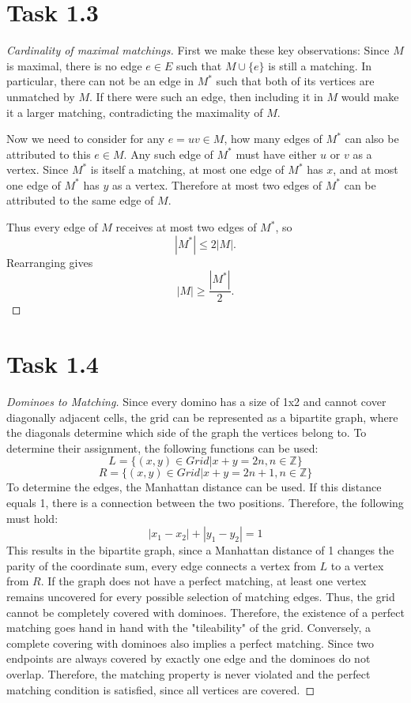 \documentclass{Group_Templ}
\begin{document}
	
	\section*{Task 1.3}
	
	\begin{proof}[Cardinality of maximal matchings]
		First we make these key observations:
    Since \(M\) is maximal, there is no edge \(e\in E\) such that \(M\cup\{e\}\) is still a matching.
    In particular, there can not be an edge in \(M^*\) such that both of its vertices are unmatched by \(M\).
    If there were such an edge, then including it in \(M\) would make it a larger matching, contradicting the maximality of \(M\).

    Now we need to consider for any \(e=uv\in M\), how many edges of \(M^*\) can also be attributed to this \(e\in M\). 
    Any such edge of \(M^*\) must have either \(u\) or \(v\) as a vertex.
    Since \(M^*\) is itself a matching, at most one edge of \(M^*\) has \(x\), and at most one edge of \(M^*\) has \(y\) as a vertex.
    Therefore at most two edges of \(M^*\) can be attributed to the same edge of \(M\).

    \vspace{1em}
    \center Thus every edge of \(M\) receives at most two edges of \(M^*\), so
    \[
    |M^*| \le 2|M|.
    \]
    Rearranging gives
    \[
    |M| \ge \frac{|M^*|}{2}.
    \]
	\end{proof}
	
	\section*{Task 1.4}
	\begin{proof}[Dominoes to Matching]
		Since every domino has a size of 1x2 and cannot cover diagonally adjacent cells, the grid can be represented as a bipartite graph, where the diagonals determine which side of the graph the vertices belong to. To determine their assignment, the following functions can be used:
		\[L=\{(x,y) \in Grid | x + y = 2n, n \in \mathbb{Z}\}\]
		\[R=\{(x,y) \in Grid | x + y = 2n+1, n \in \mathbb{Z}\}\] To determine the edges, the Manhattan distance can be used. If this distance equals 1, there is a connection between the two positions. Therefore, the following must hold:
		\[|x_1-x_2|+|y_1-y_2|=1\] This results in the bipartite graph, since a Manhattan distance of 1 changes the parity of the coordinate sum, every edge connects a vertex from \(L\) to a vertex from \(R\). If the graph does not have a perfect matching, at least one vertex remains uncovered for every possible selection of matching edges. Thus, the grid cannot be completely covered with dominoes. Therefore, the existence of a perfect matching goes hand in hand with the "tileability" of the grid. Conversely, a complete covering with dominoes also implies a perfect matching. Since two endpoints are always covered by exactly one edge and the dominoes do not overlap. Therefore, the matching property is never violated and the perfect matching condition is satisfied, since all vertices are covered.
	\end{proof}
  
\end{document}
